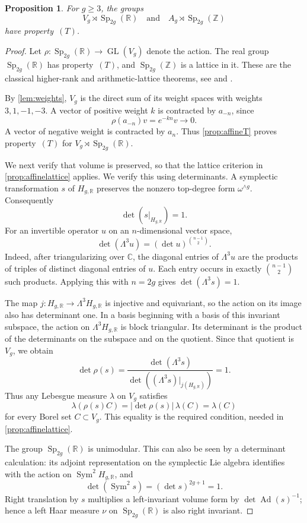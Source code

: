 \documentclass[11pt,a4paper]{article}
\newtheorem{proposition}[theorem]{Proposition}
\theoremstyle{definition}
\newcommand{\R}{\mathbb R}
\newcommand{\Z}{\mathbb Z}
\newcommand{\C}{\mathbb C}
\newcommand{\Sp}{\operatorname{Sp}}
\newcommand{\GL}{\operatorname{GL}}
\newcommand{\Ad}{\operatorname{Ad}}
\newcommand{\rt}{(T)}
\begin{document}
\begin{proposition}
\label{prop:arithmeticT}
For \(g\ge3\), the groups
\[
 V_g\rtimes\Sp_{2g}(\R)
 \quad\text{and}\quad A_g\rtimes\Sp_{2g}(\Z)
\]
have property~\(\rt\).
\end{proposition}
\begin{proof}
Let \(\rho:\Sp_{2g}(\R)\to\GL(V_g)\) denote the action.
The real group \(\Sp_{2g}(\R)\) has property~\(\rt\),
and \(\Sp_{2g}(\Z)\) is a lattice in it.
These are the classical higher-rank and arithmetic-lattice
theorems, see \cite[Chapters~1 and~3 and Appendix~B]{BHV}
and \cite{Raghunathan}.

By \cref{lem:weights}, \(V_g\) is the direct sum of its weight
spaces with weights \(3,1,-1,-3\). A vector of positive weight
\(k\) is contracted by \(a_{-n}\), since
\[
 \rho(a_{-n})v=e^{-kn}v\longrightarrow0.
\]
A vector of negative weight is contracted by \(a_n\). Thus
\cref{prop:affineT} proves property~\(\rt\) for
\(V_g\rtimes\Sp_{2g}(\R)\).

We next verify that volume is preserved, so that the lattice
criterion in \cref{prop:affinelattice} applies.
We verify this using determinants. 
A symplectic transformation \(s\) of \(H_{g,\R}\)
preserves the nonzero top-degree form \(\omega^{\wedge g}\).
Consequently
\[
 \det(s|_{H_{g,\R}})=1.
\]
For an invertible operator \(u\) on an \(n\)-dimensional vector
space,
\[
 \det(\Lambda^3u)=(\det u)^{\binom{n-1}{2}}.
\]
Indeed, after triangularizing over \(\C\), the diagonal entries
of \(\Lambda^3u\) are the products of triples of distinct
diagonal entries of \(u\). Each entry occurs in exactly
\(\binom{n-1}{2}\) such products. Applying this with \(n=2g\)
gives \(\det(\Lambda^3s)=1\).

The map \(j:H_{g,\R}\to\Lambda^3H_{g,\R}\) is injective and
equivariant, so the action on its image also has determinant
one. In a basis beginning with a basis of this invariant
subspace, the action on \(\Lambda^3H_{g,\R}\) is block
triangular. Its determinant is the product of the determinants
on the subspace and on the quotient. Since that quotient is
\(V_g\), we obtain
\[
 \det\rho(s)
 =\frac{\det(\Lambda^3s)}
        {\det((\Lambda^3s)|_{j(H_{g,\R})})}
 =1.
\]
Thus any Lebesgue measure \(\lambda\) on \(V_g\) satisfies
\[
 \lambda(\rho(s)C)
 =|\det\rho(s)|\,\lambda(C)=\lambda(C)
\]
for every Borel set \(C\subset V_g\). This equality is the required condition, needed in \cref{prop:affinelattice}.

The group \(\Sp_{2g}(\R)\) is unimodular. This can also be seen
by a determinant calculation: its adjoint representation on
the symplectic Lie algebra identifies with the action on
\(\operatorname{Sym}^2H_{g,\R}\), and
\[
 \det(\operatorname{Sym}^2s)=(\det s)^{2g+1}=1.
\]
Right translation by \(s\) multiplies a left-invariant volume
form by \(\det\Ad(s)^{-1}\); hence a left Haar measure
\(\nu\) on \(\Sp_{2g}(\R)\) is also right invariant.


\end{proof}
\end{document}
